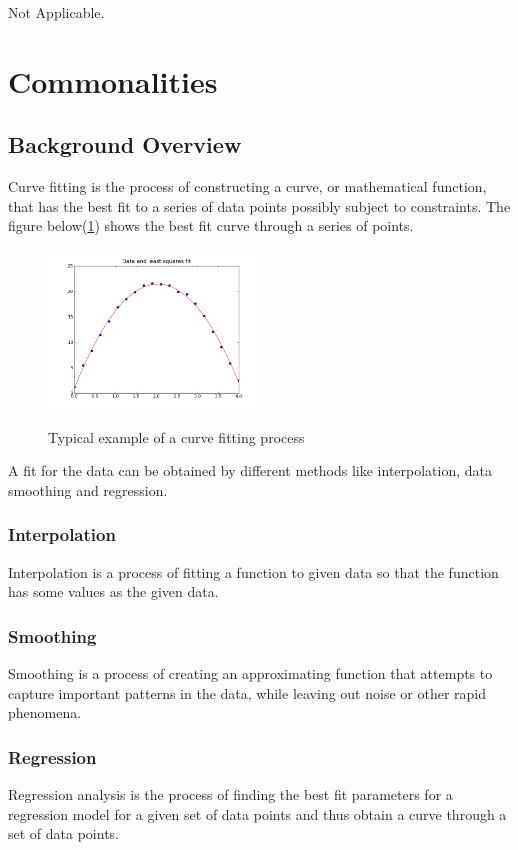\documentclass[12pt]{article}
\begin{document}
Not Applicable.

\section{Commonalities}

\subsection{Background Overview} \label{Sec_Background}
Curve fitting is the process of constructing a curve, or mathematical function, that has the best fit to a series of data points possibly subject to constraints. The figure below(\ref{Fig_CurveFitEg}) shows the best fit curve through a series of points.
\begin{figure}[h!]
	\begin{center}
		{
			\includegraphics[width=0.5\textwidth]{lstsq11.png}
		}
		\caption{\label{Fig_CurveFitEg} Typical example of a curve fitting process}
	\end{center}
\end{figure}

A fit for the data can be obtained by different methods like interpolation, data smoothing and regression.

\subsubsection{Interpolation}
Interpolation is a process of fitting a function to given data so that the function has some values as the given data.

\subsubsection{Smoothing}
Smoothing is a process of creating an approximating function that attempts to capture important patterns in the data, while leaving out noise or other rapid phenomena.

\subsubsection{Regression}
Regression analysis is the process of finding the best fit parameters for a regression model for a given set of data points and thus obtain a curve through a set of data points.
\end{document}
